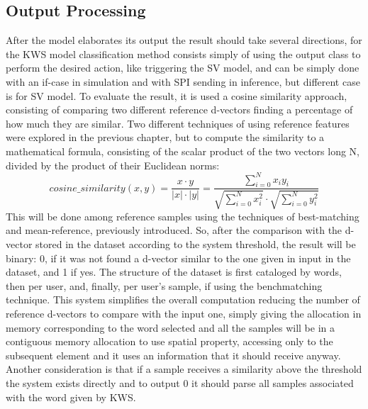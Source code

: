 \subsection{Output Processing}
After the model elaborates its output the result should take several directions, for the KWS model classification method consists simply of using the output class to perform the desired action, like triggering the SV model, and can be simply done with an if-case in simulation and with SPI sending in inference, but different case is for SV model. To evaluate the result, it is used a cosine similarity approach, consisting of comparing two different reference d-vectors finding a percentage of how much they are similar. Two different techniques of using reference features were explored in the previous chapter, but to compute the similarity to a mathematical formula, consisting of the scalar product of the two vectors long N, divided by the product of their Euclidean norms:\newline
\begin{equation}
    cosine\_similarity(x,y)=\frac{x\cdot y}{|x|\cdot|y|}=\frac{\sum_{i=0}^{N}x_iy_i}{\sqrt{\sum_{i=0}^{N}x_i^2}\cdot\sqrt{\sum_{i=0}^{N}y_i^2}}
\end{equation}
This will be done among reference samples using the techniques of best-matching and mean-reference, previously introduced. So, after the comparison with the d-vector stored in the dataset according to the system threshold, the result will be binary: 0, if it was not found a d-vector similar to the one given in input in the dataset, and 1 if yes.\newline
The structure of the dataset is first cataloged by words, then per user, and, finally, per user's sample, if using the benchmatching technique. This system simplifies the overall computation reducing the number of reference d-vectors to compare with the input one, simply giving the allocation in memory corresponding to the word selected and all the samples will be in a contiguous memory allocation to use spatial property, accessing only to the subsequent element and it uses an information that it should receive anyway. Another consideration is that if a sample receives a similarity above the threshold the system exists directly and to output 0 it should parse all samples associated with the word given by KWS.\newline
